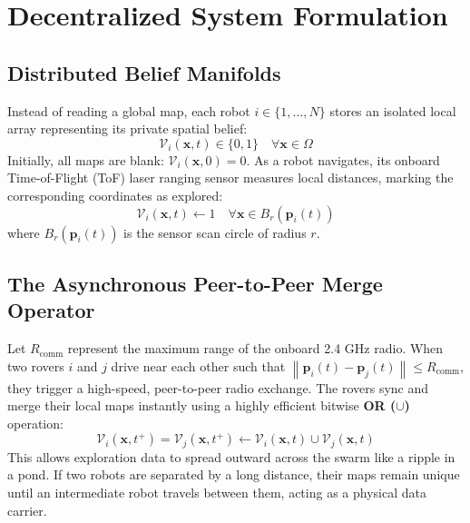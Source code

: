 \documentclass[journal,twoside]{IEEEtran}
\newcommand{\norm}[1]{\left\lVert#1\right\rVert}
\begin{document}
\section{Decentralized System Formulation}
\label{sec:formulation}

\subsection{Distributed Belief Manifolds}
Instead of reading a global map, each robot $i \in \{1, \dots, N\}$ stores an isolated local array representing its private spatial belief:
\begin{equation}
    \mathcal{V}_i(\mathbf{x}, t) \in \{0, 1\} \quad \forall \mathbf{x} \in \Omega
\end{equation}
Initially, all maps are blank: $\mathcal{V}_i(\mathbf{x}, 0) = 0$. As a robot navigates, its onboard Time-of-Flight (ToF) laser ranging sensor measures local distances, marking the corresponding coordinates as explored:
\begin{equation}
    \mathcal{V}_i(\mathbf{x}, t) \leftarrow 1 \quad \forall \mathbf{x} \in B_r(\mathbf{p}_i(t))
\end{equation}
where $B_r(\mathbf{p}_i(t))$ is the sensor scan circle of radius $r$.

\subsection{The Asynchronous Peer-to-Peer Merge Operator}
Let $R_{\text{comm}}$ represent the maximum range of the onboard 2.4 GHz radio. When two rovers $i$ and $j$ drive near each other such that $\norm{\mathbf{p}_i(t) - \mathbf{p}_j(t)} \leq R_{\text{comm}}$, they trigger a high-speed, peer-to-peer radio exchange. The rovers sync and merge their local maps instantly using a highly efficient bitwise \textbf{OR ($\cup$)} operation:
\begin{equation}
    \mathcal{V}_i(\mathbf{x}, t^+) = \mathcal{V}_j(\mathbf{x}, t^+) \leftarrow \mathcal{V}_i(\mathbf{x}, t) \cup \mathcal{V}_j(\mathbf{x}, t)
\end{equation}
This allows exploration data to spread outward across the swarm like a ripple in a pond. If two robots are separated by a long distance, their maps remain unique until an intermediate robot travels between them, acting as a physical data carrier.
\end{document}
